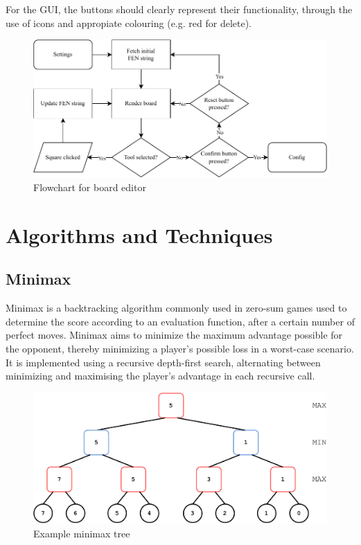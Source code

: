 \documentclass[../main/main.tex]{subfiles}
\begin{document}
For the GUI, the buttons should clearly represent their functionality, through the use of icons and appropiate colouring (e.g. red for delete).

\begin{figure}[H]
    \centering
    \includegraphics[width=\columnwidth]{../design/assets/editor_flowchart.pdf}
    \caption{Flowchart for board editor}
    \label{fig:editor-flowchart}
\end{figure}

\section{Algorithms and Techniques}
\subsection{Minimax}
\label{sec:design-minimax}
Minimax is a backtracking algorithm commonly used in zero-sum games used to determine the score according to an evaluation function, after a certain number of perfect moves. Minimax aims to minimize the maximum advantage possible for the opponent, thereby minimizing a player’s possible loss in a worst-case scenario. It is implemented using a recursive depth-first search, alternating between minimizing and maximising the player’s advantage in each recursive call.

\begin{figure}[H]
    \centering
    \includegraphics[width=\columnwidth]{../design/assets/minimax.pdf}
    \caption{Example minimax tree}
    \label{fig:minimax}
\end{figure}
\end{document}
